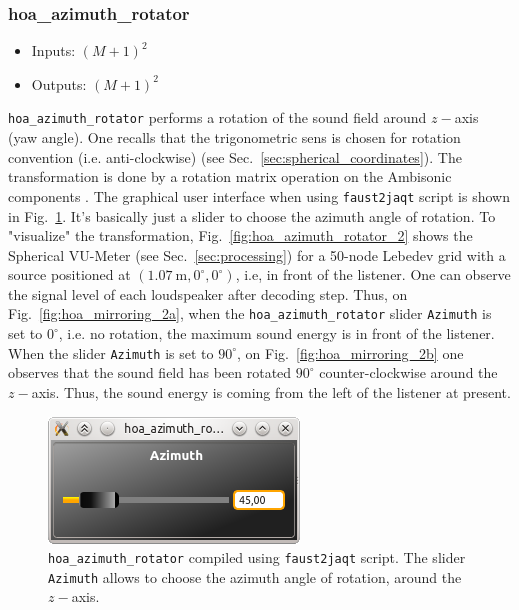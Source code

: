 \documentclass[10pt,a4paper]{article}
\begin{document}
\subsubsection{hoa\_azimuth\_rotator}
\begin{itemize}
\item Inputs: $(M+1)^2$
\item Outputs: $(M+1)^2$
\end{itemize}
\lstinline'hoa_azimuth_rotator' performs a rotation of the sound field around $z-$axis (yaw angle). One recalls that the trigonometric sens is chosen for rotation convention (i.e. anti-clockwise) (see Sec.~\ref{sec:spherical_coordinates}). The transformation is done by a rotation matrix operation on the Ambisonic components \cite{daniel2000representation, moreau2006etude,kronlachner2014spatial}. The graphical user interface when using \lstinline'faust2jaqt' script is shown in Fig.~\ref{fig:hoa_azimuth_rotator}. It's basically just a slider to choose the azimuth angle of rotation. To "visualize" the transformation, Fig.~\ref{fig:hoa_azimuth_rotator_2} shows the Spherical VU-Meter (see Sec.~\ref{sec:processing}) for a 50-node Lebedev grid with a source positioned at $(1.07~\text{m}, 0^\circ, 0^\circ)$, i.e, in front of the listener. One can observe the signal level of each loudspeaker after decoding step. Thus, on Fig.~\ref{fig:hoa_mirroring_2a}, when the \lstinline'hoa_azimuth_rotator' slider \lstinline'Azimuth' is set to $0^\circ$, i.e. no rotation, the maximum sound energy is in front of the listener. When the slider \lstinline'Azimuth' is set to $90^\circ$, on Fig.~\ref{fig:hoa_mirroring_2b} one observes that the sound field has been rotated $90^\circ$ counter-clockwise around the $z-$axis. Thus, the sound energy is coming from the left of the listener at present.
\begin{figure}[!ht]
\centering
\includegraphics[width=0.3\columnwidth]{hoa_azimuth_rotator.png}
\caption{\lstinline'hoa_azimuth_rotator' compiled using \lstinline'faust2jaqt' script. The slider \lstinline'Azimuth' allows to choose the azimuth angle of rotation, around the $z-$axis.}
\label{fig:hoa_azimuth_rotator}
\end{figure}
\end{document}

